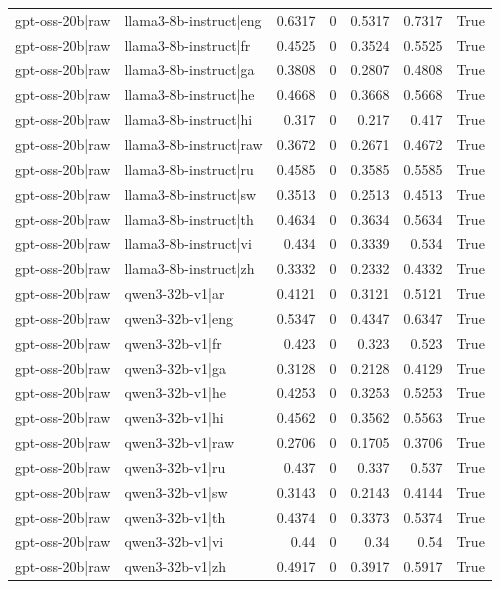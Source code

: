 \begin{table}
\begin{tabular}{l l r r r r l}
gpt-oss-20b|raw & llama3-8b-instruct|eng & 0.6317 & 0 & 0.5317 & 0.7317 & True \\
gpt-oss-20b|raw & llama3-8b-instruct|fr & 0.4525 & 0 & 0.3524 & 0.5525 & True \\
gpt-oss-20b|raw & llama3-8b-instruct|ga & 0.3808 & 0 & 0.2807 & 0.4808 & True \\
gpt-oss-20b|raw & llama3-8b-instruct|he & 0.4668 & 0 & 0.3668 & 0.5668 & True \\
gpt-oss-20b|raw & llama3-8b-instruct|hi & 0.317 & 0 & 0.217 & 0.417 & True \\
gpt-oss-20b|raw & llama3-8b-instruct|raw & 0.3672 & 0 & 0.2671 & 0.4672 & True \\
gpt-oss-20b|raw & llama3-8b-instruct|ru & 0.4585 & 0 & 0.3585 & 0.5585 & True \\
gpt-oss-20b|raw & llama3-8b-instruct|sw & 0.3513 & 0 & 0.2513 & 0.4513 & True \\
gpt-oss-20b|raw & llama3-8b-instruct|th & 0.4634 & 0 & 0.3634 & 0.5634 & True \\
gpt-oss-20b|raw & llama3-8b-instruct|vi & 0.434 & 0 & 0.3339 & 0.534 & True \\
gpt-oss-20b|raw & llama3-8b-instruct|zh & 0.3332 & 0 & 0.2332 & 0.4332 & True \\
gpt-oss-20b|raw & qwen3-32b-v1|ar & 0.4121 & 0 & 0.3121 & 0.5121 & True \\
gpt-oss-20b|raw & qwen3-32b-v1|eng & 0.5347 & 0 & 0.4347 & 0.6347 & True \\
gpt-oss-20b|raw & qwen3-32b-v1|fr & 0.423 & 0 & 0.323 & 0.523 & True \\
gpt-oss-20b|raw & qwen3-32b-v1|ga & 0.3128 & 0 & 0.2128 & 0.4129 & True \\
gpt-oss-20b|raw & qwen3-32b-v1|he & 0.4253 & 0 & 0.3253 & 0.5253 & True \\
gpt-oss-20b|raw & qwen3-32b-v1|hi & 0.4562 & 0 & 0.3562 & 0.5563 & True \\
gpt-oss-20b|raw & qwen3-32b-v1|raw & 0.2706 & 0 & 0.1705 & 0.3706 & True \\
gpt-oss-20b|raw & qwen3-32b-v1|ru & 0.437 & 0 & 0.337 & 0.537 & True \\
gpt-oss-20b|raw & qwen3-32b-v1|sw & 0.3143 & 0 & 0.2143 & 0.4144 & True \\
gpt-oss-20b|raw & qwen3-32b-v1|th & 0.4374 & 0 & 0.3373 & 0.5374 & True \\
gpt-oss-20b|raw & qwen3-32b-v1|vi & 0.44 & 0 & 0.34 & 0.54 & True \\
gpt-oss-20b|raw & qwen3-32b-v1|zh & 0.4917 & 0 & 0.3917 & 0.5917 & True \\

\end{tabular}
\end{table}
